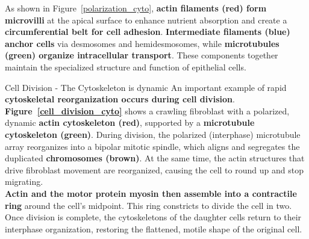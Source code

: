 \documentclass[../main.tex]{subfiles}
\begin{document}
\indent As shown in Figure~\ref{polarization_cyto}, \textbf{actin filaments (red) form microvilli} at the apical surface to enhance nutrient absorption and create a \textbf{circumferential belt for cell adhesion}. \textbf{Intermediate filaments (blue) anchor cells} via desmosomes and hemidesmosomes, while \textbf{microtubules (green) organize intracellular transport}. These components together maintain the specialized structure and function of epithelial cells.

\begin{ExWithTitle}{Cell Division - The Cytoskeleton is dynamic}
	An important example of rapid \textbf{cytoskeletal reorganization occurs during cell division}. \textbf{Figure~\ref{cell_division_cyto}} shows a crawling fibroblast with a polarized, dynamic \textbf{actin cytoskeleton (red)}, supported by a \textbf{microtubule cytoskeleton (green)}. During division, the polarized (interphase) microtubule array reorganizes into a bipolar mitotic spindle, which aligns and segregates the duplicated \textbf{chromosomes (brown)}. At the same time, the actin structures that drive fibroblast movement are reorganized, causing the cell to round up and stop migrating. \\
	\indent \textbf{Actin and the motor protein myosin then assemble into a contractile ring} around the cell’s midpoint. This ring constricts to divide the cell in two. Once division is complete, the cytoskeletons of the daughter cells return to their interphase organization, restoring the flattened, motile shape of the original cell.
\end{ExWithTitle}
\end{document}
